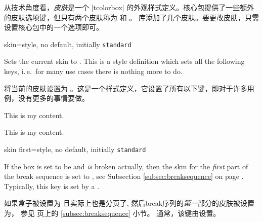 从技术角度看，\emph{皮肤}是一个 |tcolorbox| 的外观样式定义。核心包提供了一些额外的皮肤选项键，但只有两个皮肤称为  和 。  库添加了几个皮肤。要更改皮肤，只需设置核心包中的一个选项即可。



\begin{docTcbKey}{skin}{=}{style, no default, initially \texttt{standard}}

Sets the current skin to . This is a style definition which sets all the following
keys, i.\,e.\ for many use cases there is nothing more to do.


将当前的皮肤设置为 。这是一个样式定义，它设置了所有以下键，即对于许多用例，没有更多的事情要做。



\begin{dispExample}

\begin{tcolorbox}[adjusted title=adjusted皮肤]
  This is my content.
\end{tcolorbox}
\begin{tcolorbox}[beamer,adjusted title=beamer皮肤]
  This is my content.
\end{tcolorbox}
\end{dispExample}
\end{docTcbKey}


  \begin{docTcbKey}{skin first}{=}{style, no default, initially \texttt{standard}}

    
If the box is set to be  and \emph{is} broken actually,
then the skin for the \emph{first} part of the break sequence
is set to , see Subsection \ref{subsec:breaksequence} on page \pageref{subsec:breaksequence}.
Typically, this key is set by a .

如果盒子被设置为 且实际上也是分页了,%
然后break序列的\emph{第一}部分的皮肤被设置为，
参见 \pageref{subsec:breaksequence} 页上的 \ref{subsec:breaksequence} 小节。
通常，该键由设置。

\end{docTcbKey}


